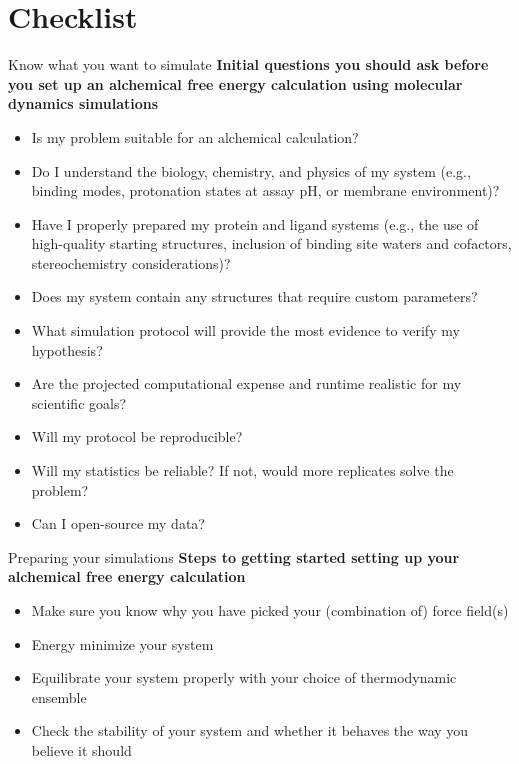 \documentclass[9pt,bestpractices]{livecoms}
\begin{document}
\section{Checklist}
\label{sec:checklist}
\begin{Checklists*}
\begin{checklist}{ Know what you want to simulate}
    \textbf{Initial questions you should ask before you set up an alchemical free energy calculation using molecular dynamics simulations}
\begin{itemize}
    \item Is my problem suitable for an alchemical calculation?
    \item Do I understand the biology, chemistry, and physics of my system (e.g., binding modes, protonation states at assay pH, or membrane environment)?
    \item Have I properly prepared my protein and ligand systems (e.g., the use of high-quality starting structures, inclusion of binding site waters and cofactors, stereochemistry considerations)?
    \item Does my system contain any structures that require custom parameters?
    \item What simulation protocol will provide the most evidence to verify my hypothesis?
    \item Are the projected computational expense and runtime realistic for my scientific goals?
    \item Will my protocol be reproducible? 
    \item Will my statistics be reliable? If not, would more replicates solve the problem? 
    \item Can I open-source my data?
\end{itemize}
\end{checklist}

\begin{checklist}{Preparing your simulations}
\textbf{Steps to getting started setting up your alchemical free energy calculation}
\begin{itemize}
    \item Make sure you know why you have picked your (combination of) force field(s)
    \item Energy minimize your system
    \item Equilibrate your system properly with your choice of thermodynamic ensemble
    \item Check the stability of your system and whether it behaves the way you believe it should
\end{itemize}
\end{checklist}


\end{Checklists*}
\end{document}
